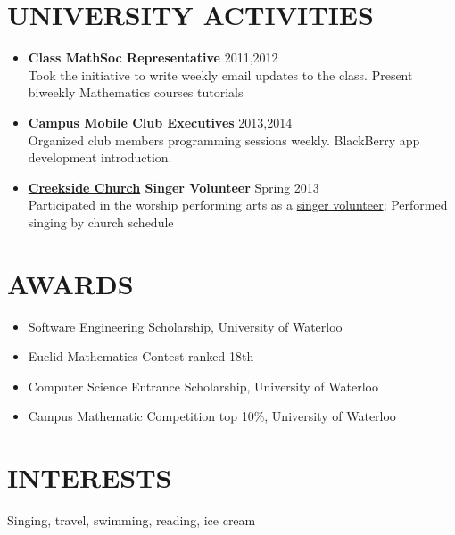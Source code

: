 \documentclass[line,margin]{res}
\begin{document}
\begin{resume}
\section{\uppercase{University Activities}}
\begin{itemize}
\item {\bf Class MathSoc Representative} \hfill 2011,2012 \\
Took the initiative to write weekly email updates to the class. Present biweekly Mathematics courses tutorials
\item {\bf Campus Mobile Club Executives} \hfill 2013,2014 \\
Organized club members programming sessions weekly. BlackBerry app development introduction. \item {\bf \href{http://www.creeksidechurch.ca/index.php}{Creekside Church} Singer Volunteer} \hfill Spring 2013 \\
Participated in the worship performing arts as a \href{http://www.creeksidechurch.ca/volunteer.php}{singer volunteer}; Performed singing by church schedule
\end{itemize}

\section{\uppercase{Awards}}
\begin{itemize}
\item Software Engineering Scholarship, University of Waterloo
\item Euclid Mathematics Contest ranked 18th
\item Computer Science Entrance Scholarship, University of Waterloo
\item Campus Mathematic Competition top 10\%, University of Waterloo
\end{itemize}

\section{\uppercase{Interests}}
Singing, travel, swimming, reading, ice cream

\end{resume} 
\end{document}
